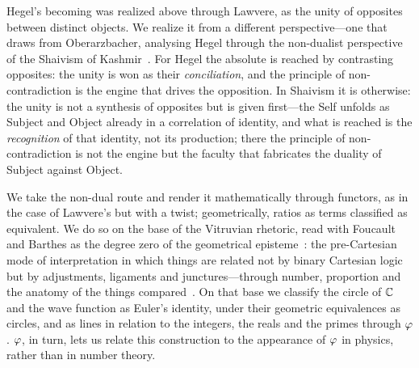 Hegel's becoming was realized above through Lawvere, as the unity of opposites between distinct objects. We realize it from a different perspective---one that draws from Oberarzbacher, analysing Hegel through the non-dualist perspective of the Shaivism of Kashmir~\cite{Oberarzbacher2013}. For Hegel the absolute is reached by contrasting opposites: the unity is won as their \emph{conciliation}, and the principle of non-contradiction is the engine that drives the opposition. In Shaivism it is otherwise: the unity is not a synthesis of opposites but is given first---the Self unfolds as Subject and Object already in a correlation of identity, and what is reached is the \emph{recognition} of that identity, not its production; there the principle of non-contradiction is not the engine but the faculty that fabricates the duality of Subject against Object.

We take the non-dual route and render it mathematically through functors, as in the case of Lawvere's but with a twist; geometrically, ratios as terms classified as equivalent. We do so on the base of the Vitruvian rhetoric, read with Foucault and Barthes as the degree zero of the geometrical episteme~\cite{Foucault66,Barthes53}: the pre-Cartesian mode of interpretation in which things are related not by binary Cartesian logic but by adjustments, ligaments and junctures---through number, proportion and the anatomy of the things compared~\cite{Santos2020}. On that base we classify the circle of $\mathbb{C}$ and the wave function as Euler's identity, under their geometric equivalences as circles, and as lines in relation to the integers, the reals and the primes through $\varphi$. $\varphi$, in turn, lets us relate this construction to the appearance of $\varphi$ in physics, rather than in number theory.


